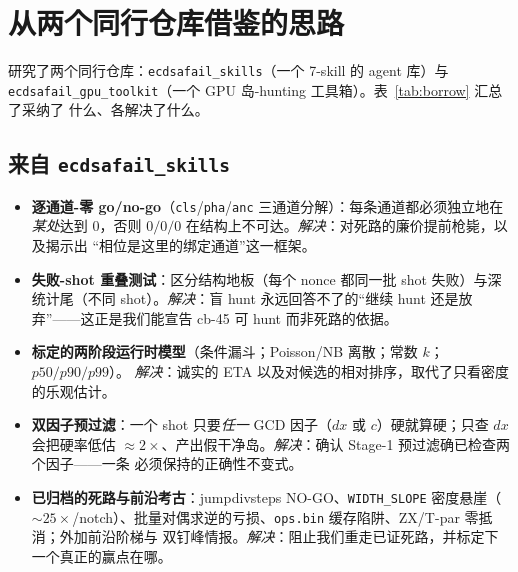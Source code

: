 \documentclass[11pt]{ctexart}
\let\c\lstinline
\begin{document}
\section{从两个同行仓库借鉴的思路}
\label{sec:borrow}

研究了两个同行仓库：\texttt{ecdsafail\_skills}（一个 7-skill 的 agent 库）与
\texttt{ecdsafail\_gpu\_toolkit}（一个 GPU 岛-hunting 工具箱）。表~\ref{tab:borrow} 汇总了采纳了
什么、各解决了什么。

\subsection{来自 \texttt{ecdsafail\_skills}}
\begin{itemize}[nosep]
  \item \textbf{逐通道-零 go/no-go}（\c{cls}/\c{pha}/\c{anc} 三通道分解）：每条通道都必须独立地在
  \emph{某处}达到 $0$，否则 $0/0/0$ 在结构上不可达。\emph{解决}：对死路的廉价提前枪毙，以及揭示出
  ``相位是这里的绑定通道''这一框架。
  \item \textbf{失败-shot 重叠测试}：区分结构地板（每个 nonce 都同一批 shot 失败）与深统计尾（不同
  shot）。\emph{解决}：盲 hunt 永远回答不了的``继续 hunt 还是放弃''——这正是我们能宣告 cb-45 可 hunt
  而非死路的依据。
  \item \textbf{标定的两阶段运行时模型}（条件漏斗；Poisson/NB 离散；常数 $k$；$p50/p90/p99$）。
  \emph{解决}：诚实的 ETA 以及对候选的相对排序，取代了只看密度的乐观估计。
  \item \textbf{双因子预过滤}：一个 shot 只要\emph{任一} GCD 因子（$dx$ 或 $c$）硬就算硬；只查 $dx$
  会把硬率低估 $\approx 2\times$、产出假干净岛。\emph{解决}：确认 Stage-1 预过滤确已检查两个因子——一条
  必须保持的正确性不变式。
  \item \textbf{已归档的死路与前沿考古}：jumpdivsteps NO-GO、\c{WIDTH_SLOPE} 密度悬崖（$\sim
  25\times$/notch）、批量对偶求逆的亏损、\texttt{ops.bin} 缓存陷阱、ZX/T-par 零抵消；外加前沿阶梯与
  双钉峰情报。\emph{解决}：阻止我们重走已证死路，并标定下一个真正的赢点在哪。
\end{itemize}
\end{document}
